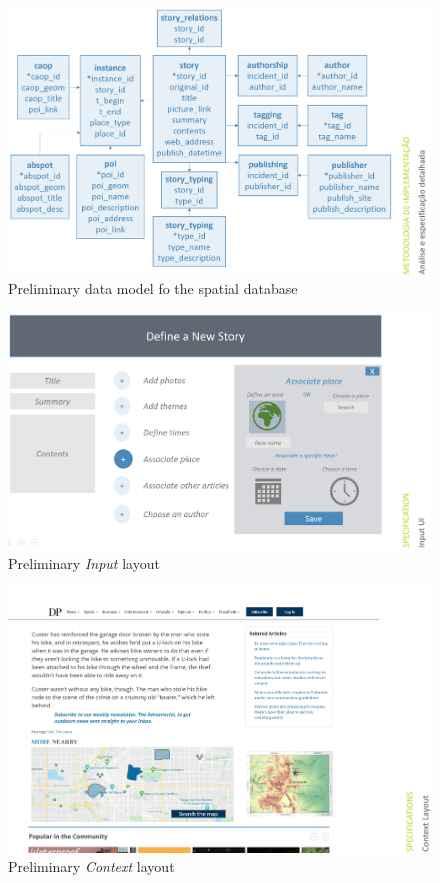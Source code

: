 \begin{figure}[H]
	\centering
	\includegraphics[width=.9\linewidth]{images/data_model.png}
	\caption{Preliminary data model fo the spatial database}
	\label{fig:data_model}
\end{figure}

\begin{figure}[H]
	\centering
	\includegraphics[width=.9\linewidth]{images/input_layout.png}
	\caption{Preliminary \textit{Input} layout}
	\label{fig:input_ui}
\end{figure}

\begin{figure}[H]
	\centering
	\includegraphics[width=.9\linewidth]{images/context_layout.png}
	\caption{Preliminary \textit{Context} layout}
	\label{fig:context_ui}
\end{figure}

